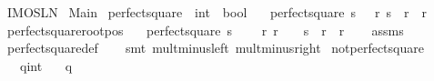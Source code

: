 %
\begin{isabellebody}%
%
%
\isadelimdocument
%
\endisadelimdocument
%
\isatagdocument
%
\isamarkuptrue%
%
\isamarkuptrue%
%
\endisatagdocument
{\isafolddocument}%
%
\isadelimdocument
%
\endisadelimdocument
%
\isadelimtheory
%
\endisadelimtheory
%
\isatagtheory
{}\isamarkupfalse%
\ IMO{\isacharunderscore}{}{}{}{}{\isacharunderscore}SL{\isacharunderscore}N{}\isanewline
{}\ Main\isanewline
{}%
\endisatagtheory
{\isafoldtheory}%
%
\isadelimtheory
\isanewline
%
\endisadelimtheory
\isanewline
{}\isamarkupfalse%
\ perfect{\isacharunderscore}square\ {\isacharcolon}{\isacharcolon}\ {\isachardoublequoteopen}int\ {\isasymRightarrow}\ bool{\isachardoublequoteclose}\ \isanewline
\ \ {\isachardoublequoteopen}perfect{\isacharunderscore}square\ s\ {\isasymlongleftrightarrow}\ {\isacharparenleft}{\isasymexists}\ r{\isachardot}\ s\ {\isacharequal}\ r\ {\isacharasterisk}\ r{\isacharparenright}{\isachardoublequoteclose}\isanewline
\isanewline
{}\isamarkupfalse%
\ perfect{\isacharunderscore}square{\isacharunderscore}root{\isacharunderscore}pos{\isacharcolon}\isanewline
\ \ \ {\isachardoublequoteopen}perfect{\isacharunderscore}square\ s{\isachardoublequoteclose}\isanewline
\ \ \ {\isachardoublequoteopen}{\isasymexists}\ r{\isachardot}\ r\ {\isasymge}\ {}\ {\isasymand}\ s\ {\isacharequal}\ r\ {\isacharasterisk}\ r{\isachardoublequoteclose}\isanewline
%
\isadelimproof
\ \ %
\endisadelimproof
%
\isatagproof
{}\isamarkupfalse%
\ assms\isanewline
\ \ \isamarkupfalse%
\ perfect{\isacharunderscore}square{\isacharunderscore}def\isanewline
\ \ \isamarkupfalse%
\ {\isacharparenleft}smt\ mult{\isacharunderscore}minus{\isacharunderscore}left\ mult{\isacharunderscore}minus{\isacharunderscore}right{\isacharparenright}%
\endisatagproof
{\isafoldproof}%
%
\isadelimproof
\isanewline
%
\endisadelimproof
\isanewline
{}\isamarkupfalse%
\ not{\isacharunderscore}perfect{\isacharunderscore}square{\isacharunderscore}{}{}{\isacharcolon}\isanewline
\ \ \ q{\isacharcolon}{\isacharcolon}int\isanewline
\ \ \ {\isachardoublequoteopen}q{\isacharcircum}{}\ {\isasymnoteq}\ {}{}{\isachardoublequoteclose}\isanewline

\end{isabellebody}
